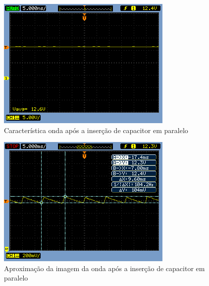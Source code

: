 \documentclass[a4paper]{article} %
\begin{document}
\newpage
\begin{figure}[h!]
\begin{centering}
\includegraphics[scale=0.7]{Imagens/3.3.4capacitor_paralelo/3cao1} \caption{Característica onda após a inserção de capacitor em paralelo \label{fig:Fig-45}}
\par\end{centering}
\end{figure}


\begin{figure}[h!]
\begin{centering}
\includegraphics[scale=0.7]{Imagens/3.3.4capacitor_paralelo/3cap} \caption{Aproximação da imagem da onda após a inserção de capacitor em paralelo \label{fig:q2-cap}}
\par\end{centering}
\end{figure}
\end{document}
